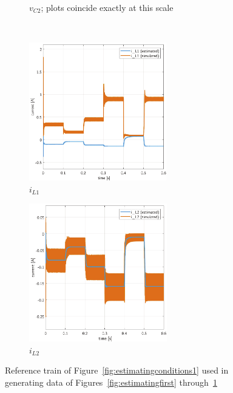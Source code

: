 \begin{figure}[H]
\begin{framed}
\begin{subfigure}[b]{0.45\textwidth}
    \caption{$v_{C2}$; plots coincide exactly at this scale}
    \end{subfigure}
    \\[11pt]
    \begin{subfigure}[b]{0.45\textwidth}
    \centering
    \includegraphics[height = 6cm]{figures/estimation/iL1_iL1.pdf}
    \caption{$i_{L1}$}
    \end{subfigure}
    \hfill
    \begin{subfigure}[b]{0.45\textwidth}
    \centering
    \includegraphics[height = 6cm]{figures/estimation/iL2_iL2.pdf}
    \caption{$i_{L2}$}
    \label{fig:estimatinglast}
    \end{subfigure}
    \end{framed}
    \vspace*{-8mm}
    \caption{Reference train of Figure~\ref{fig:estimatingconditions1} used in generating data of Figures~\ref{fig:estimatingfirst} through~\ref{fig:estimatinglast}}
    \label{fig:estimating}
\end{figure}
